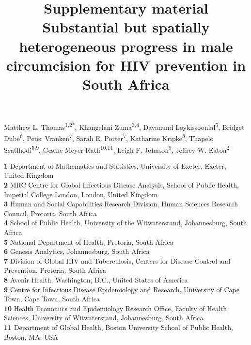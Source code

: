 \documentclass{article}
\title{Supplementary material \\[10pt]Substantial but spatially heterogeneous progress in male circumcision for HIV prevention in South Africa}
\author{}
\date{}
\begin{document}

\maketitle

\vspace{-1cm}

Matthew L. Thomas\textsuperscript{1,2*},
Khangelani Zuma\textsuperscript{3,4},
Dayanund Loykissoonlal\textsuperscript{5},
Bridget Dube\textsuperscript{6},
Peter Vranken\textsuperscript{7},
Sarah E. Porter\textsuperscript{7},
Katharine Kripke\textsuperscript{8},
Thapelo Seatlhodi\textsuperscript{5,9},
Gesine Meyer-Rath\textsuperscript{10,11},
Leigh F. Johnson\textsuperscript{9},
Jeffrey W. Eaton\textsuperscript{2} \\
\smallskip
  
\textbf{1} Department of Mathematics and Statistics, University of Exeter, Exeter, United Kingdom\\
\textbf{2} MRC Centre for Global Infectious Disease Analysis, School of Public Health, Imperial College London, London, United Kingdom\\
\textbf{3} Human and Social Capabilities Research Division, Human Sciences Research Council,  Pretoria, South Africa\\
\textbf{4} School of Public Health, University of the Witwatersrand, Johannesburg, South Africa\\
\textbf{5} National Department of Health, Pretoria, South Africa\\
\textbf{6} Genesis Analytics, Johannesburg, South Africa\\
\textbf{7} Division of Global HIV and Tuberculosis, Centers for Disease Control and Prevention, Pretoria, South Africa\\
\textbf{8} Avenir Health, Washington, D.C., United States of America\\
\textbf{9} Centre for Infectious Disease Epidemiology and Research, University of Cape Town, Cape Town, South Africa \\
\textbf{10} Health Economics and Epidemiology Research Office, Faculty of Health Sciences, University of Witwatersrand, Johannesburg, South Africa\\
\textbf{11} Department of Global Health, Boston University School of Public Health, Boston, MA, USA\\
\smallskip
\end{document}
